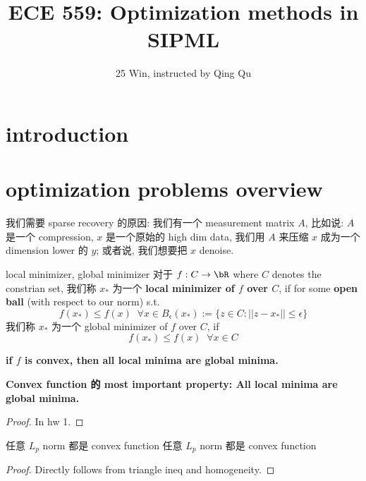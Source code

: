 \documentclass[lang=cn,11pt]{elegantbook}
\title{ECE 559: Optimization methods in SIPML}
\subtitle{25 Win, instructed by Qing Qu}
\begin{document}
\frontmatter
\tableofcontents
\mainmatter

\chapter{introduction}





\chapter{optimization problems overview}



我们需要 sparse recovery 的原因: 我们有一个 measurement matrix $A$, 比如说: $A$ 是一个 compression, $x$ 是一个原始的 high dim data, 我们用 $A$ 来压缩 $x$ 成为一个 dimension lower 的 $y$; 或者说, 我们想要把 $x$ denoise.





\begin{definition}{local minimizer, global minimizer}
    对于 $f: C \rar \bR$ where $C$ denotes the constrian set, 
    我们称 $x_*$ 为一个 \textbf{local minimizer of $f$ over $C$}, if for some \textbf{open ball} (with respect to our norm) s.t.
    $$
    f(x_*) \leq f(x) \;\; \forall x \in B_\epsilon(x_*) := \{z \in C : ||z-x_*|| \leq \epsilon  \}
    $$
    我们称 $x_*$ 为一个 global minimizer of $f$ over $C$, if 
    $$
    f(x_*) \leq f(x) \;\; \forall x\in C
    $$
\end{definition}

\begin{theorem}
\textbf{if $f$ is convex, then all local minima are global minima.}
\end{theorem}
\textbf{Convex function 的 most important property: All local minima are global minima.}
\begin{proof}
 In hw 1.
\end{proof}



\begin{theorem}{任意 $L_p$ norm 都是 convex function}
    任意 $L_p$ norm 都是 convex function
\end{theorem}
\begin{proof}
    Directly follows from triangle ineq and homogeneity.
\end{proof}
\end{document}
